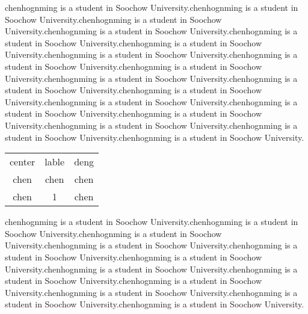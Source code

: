 \documentclass{article}
\begin{document}
chenhognming is a student in Soochow University.chenhognming is a student in Soochow University.chenhognming is a student in Soochow University.chenhognming is a student in Soochow University.chenhognming is a student in Soochow University.chenhognming is a student in Soochow University.chenhognming is a student in Soochow University.chenhognming is a student in Soochow University.chenhognming is a student in Soochow University.chenhognming is a student in Soochow University.chenhognming is a student in Soochow University.chenhognming is a student in Soochow University.chenhognming is a student in Soochow University.chenhognming is a student in Soochow University.chenhognming is a student in Soochow University.chenhognming is a student in Soochow University.chenhognming is a student in Soochow University.chenhognming is a student in Soochow University.
\begin{table}[htdp]
 \centering
 \tiny
  \begin{tabular}{|c|c|c|}
    \hline
    center & lable & deng \\
    chen & chen & chen \\
    chen & 1 & chen \\
    \hline
  \end{tabular}
 
\end{table}

chenhognming is a student in Soochow University.chenhognming is a student in Soochow University.chenhognming is a student in Soochow University.chenhognming is a student in Soochow University.chenhognming is a student in Soochow University.chenhognming is a student in Soochow University.chenhognming is a student in Soochow University.chenhognming is a student in Soochow University.chenhognming is a student in Soochow University.chenhognming is a student in Soochow University.chenhognming is a student in Soochow University.chenhognming is a student in Soochow University.
\end{document}
